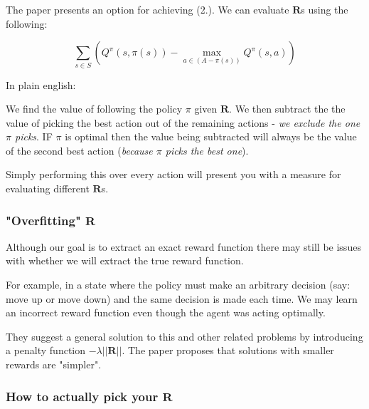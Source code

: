 \documentclass{article}
\begin{document}
    The paper presents an option for achieving (2.). We can evaluate $\mathbf{R}$s using the following:

    $$\sum_{s \in S} \left ( Q^\pi (s, \pi(s)) - \max_{a \in \left(A - \pi(s)\right)} Q^\pi (s, a) \right)$$

    
    In plain english:

    
    We find the value of following the policy $\pi$ given $\mathbf{R}$. We then subtract the the value of picking the best action out of the remaining actions - \emph{we exclude the one $\pi$ picks}.
    IF $\pi$ is optimal then the value being subtracted will always be the value of the second best action (\emph{because $\pi$ picks the best one}).
    
    Simply performing this over every action will present you with a measure for evaluating different $\mathbf{R}$s.

    \subsubsection{"Overfitting" $\mathbf{R}$}
    Although our goal is to extract an exact reward function there may still be issues with whether we will extract the true reward function.
    
    For example, in a state where the policy must make an arbitrary decision (say: move up or move down) and the same decision is made each time. We may learn an incorrect reward function even though the agent was acting optimally.

    They suggest a general solution to this and other related problems by introducing a penalty function $-\lambda ||\mathbf{R}||$. The paper proposes that solutions with smaller rewards are "simpler".

    
    
    \subsubsection{How to actually pick your $\mathbf{R}$}
\end{document}
